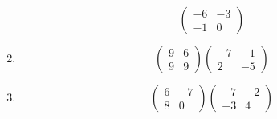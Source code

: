 \documentclass{article}%
\begin{document}
\begin{enumerate}[label=\arabic*)]
\[\begin{pmatrix}
-6&-3\\%
-1&0%
\end{pmatrix}%
\]%
\item%
\[%
\begin{pmatrix}%
9&6\\%
9&9%
\end{pmatrix} \begin{pmatrix}%
-7&-1\\%
2&-5%
\end{pmatrix}%
\]%
\item%
\[%
\begin{pmatrix}%
6&-7\\%
8&0%
\end{pmatrix} \begin{pmatrix}%
-7&-2\\%
-3&4%
\end{pmatrix}%
\]%
\end{enumerate}

%
\end{document}
